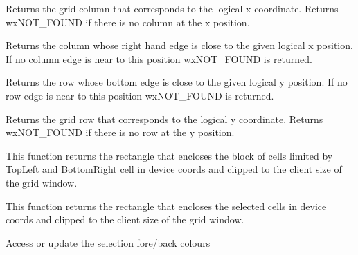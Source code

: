 \label{wxgridxtocol}


Returns the grid column that corresponds to the logical x coordinate. Returns
wxNOT\_FOUND if there is no column at the x position.

\label{wxgridxtoedgeofcol}


Returns the column whose right hand edge is close to the given logical x position.
If no column edge is near to this position wxNOT\_FOUND is returned.

\label{wxgridytoedgeofrow}


Returns the row whose bottom edge is close to the given logical y position.
If no row edge is near to this position wxNOT\_FOUND is returned.

\label{wxgridytorow}


Returns the grid row that corresponds to the logical y coordinate. Returns
wxNOT\_FOUND if there is no row at the y position.


\label{wxgridblocktodevicerect}


This function returns the rectangle that encloses the block of cells
limited by TopLeft and BottomRight cell in device coords and clipped
to the client size of the grid window.


\label{wxgridselectiontodevicerect}


This function returns the rectangle that encloses the selected cells
in device coords and clipped to the client size of the grid window.


\label{wxgridgetselectionbackground}


Access or update the selection fore/back colours


